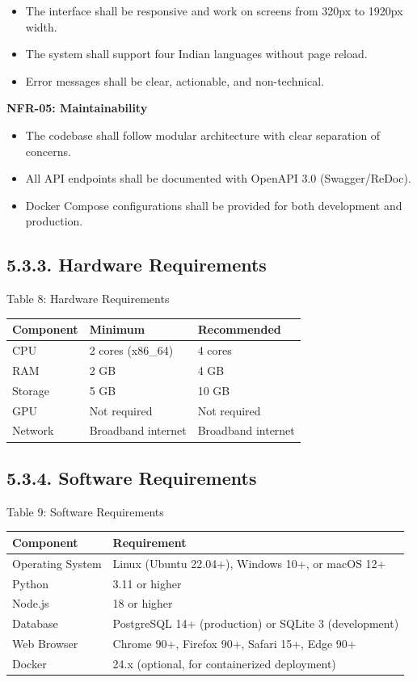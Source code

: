\documentclass[12pt, a4paper]{report}
\begin{document}
\begin{itemize}[leftmargin=*]
  \item The interface shall be responsive and work on screens from 320px to 1920px width.
  \item The system shall support four Indian languages without page reload.
  \item Error messages shall be clear, actionable, and non-technical.
\end{itemize}
\textbf{NFR-05: Maintainability}

\begin{itemize}[leftmargin=*]
  \item The codebase shall follow modular architecture with clear separation of concerns.
  \item All API endpoints shall be documented with OpenAPI 3.0 (Swagger/ReDoc).
  \item Docker Compose configurations shall be provided for both development and production.
\end{itemize}
\subsection{5.3.3. Hardware Requirements}
Table 8: Hardware Requirements

\begin{table}[htbp]
\centering
\small
\begin{tabularx}{\textwidth}{|X|X|X|}
\hline
Component & Minimum & Recommended \\
\hline
CPU & 2 cores (x86\_64) & 4 cores \\
RAM & 2 GB & 4 GB \\
Storage & 5 GB & 10 GB \\
GPU & Not required & Not required \\
Network & Broadband internet & Broadband internet \\
\hline
\end{tabularx}
\end{table}

\subsection{5.3.4. Software Requirements}
Table 9: Software Requirements

\begin{table}[htbp]
\centering
\small
\begin{tabularx}{\textwidth}{|X|X|}
\hline
Component & Requirement \\
\hline
Operating System & Linux (Ubuntu 22.04+), Windows 10+, or macOS 12+ \\
Python & 3.11 or higher \\
Node.js & 18 or higher \\
Database & PostgreSQL 14+ (production) or SQLite 3 (development) \\
Web Browser & Chrome 90+, Firefox 90+, Safari 15+, Edge 90+ \\
Docker & 24.x (optional, for containerized deployment) \\
\hline
\end{tabularx}
\end{table}
\end{document}
